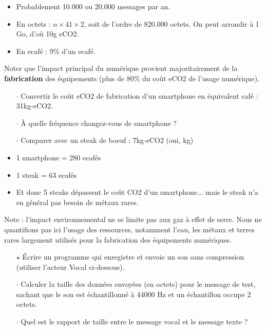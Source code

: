 \begin{reponse}
\begin{itemize}
\item Probablement 10.000 ou 20.000 messages par an.
\item En octets : $n \times 41 \times 2$, soit de l'ordre de $820.000$ octets. On peut arrondir à 1 Go, d'où 10g eCO2.
\item En ecafé : 9\% d'un ecafé.
\end{itemize}
\end{reponse}


Noter que l'impact principal du numérique provient majoritairement de la \textbf{fabrication} des équipements (plus de 80\% du coût eCO2 de l'usage numérique).

\begin{itemize}[itemsep=0.2ex]
\item[$\cdot$] Convertir le coût eCO2 de fabrication d'un smartphone en équivalent café : 31kg-eCO2.
\item[$\cdot$] À quelle fréquence changez-vous de smartphone ?
\item[$\cdot$] Comparer avec un steak de boeuf : 7kg-eCO2 (oui, kg) {\footnotesize \color{gray}{(à quelle fréquence mangez-vous de la viande ?)}}
\end{itemize}

\begin{reponse}
\begin{itemize}
\item 1 smartphone = 280 ecafés
\item 1 steak = 63 ecafés
\item Et donc 5 steaks dépassent le coût CO2 d'un smartphone... mais le steak n'a en général pas besoin de métaux rares.
\end{itemize}
\end{reponse}

\medskip

Note : l'impact environnemental ne se limite pas aux gaz à effet de serre. Nous ne quantifions pas ici l'usage des ressources, notamment l'eau, les métaux et terres rares largement utilisés pour la fabrication des équipements numériques.


\begin{itemize}
\item[$\star$] Écrire un programme qui enregistre et envoie un son sans compression (utiliser l'acteur Vocal ci-dessous).
\item[$\cdot$] Calculer la taille des données envoyées (en octets) pour le message de test, sachant que le son est échantillonné à 44000 Hz et un échantillon occupe 2 octets.
\item[$\cdot$] Quel est le rapport de taille entre le message vocal et le message texte ?
\end{itemize}

